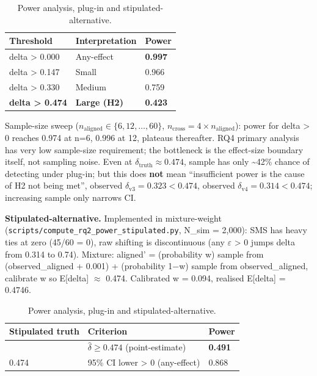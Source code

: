 \documentclass[review,12pt,authoryear]{elsarticle}
\begin{document}
{\def\LTcaptype{table} %
\begin{longtable}[]{@{}lll@{}}
\caption{Power analysis, plug-in and stipulated-alternative.}\label{tab:p2-23}\\
\toprule\noalign{}
Threshold & Interpretation & Power \\
\midrule\noalign{}
\endfirsthead
\endhead
\bottomrule\noalign{}
\endlastfoot
delta \textgreater{} 0.000 & Any-effect & \textbf{0.997} \\
delta \textgreater{} 0.147 & Small & 0.966 \\
delta \textgreater{} 0.330 & Medium & 0.759 \\
\textbf{delta \textgreater{} 0.474} & \textbf{Large (H2)} &
\textbf{0.423} \\
\end{longtable}
}

Sample-size sweep ($n_{\mathrm{aligned}} \in \{6, 12, \ldots, 60\}$, $n_{\mathrm{cross}} = 4 \times n_{\mathrm{aligned}}$):
power for delta \textgreater{} 0 reaches 0.974 at n=6, 0.996 at 12,
plateaus thereafter. RQ4 primary analysis has very low sample-size
requirement; the bottleneck is the effect-size boundary itself, not
sampling noise. Even at $\delta_{\mathrm{truth}} \approx 0.474$, sample has only
\textasciitilde42\% chance of detecting under plug-in; but this does
\textbf{not} mean ``insufficient power is the cause of H2 not being
met'', observed $\delta_{\mathrm{v3}} = 0.323 < 0.474$, observed
$\delta_{\mathrm{v4}} = 0.314 < 0.474$; increasing sample only narrows CI.

\textbf{Stipulated-alternative.} Implemented in
mixture-weight (\texttt{scripts/compute\_rq2\_power\_stipulated.py},
N\_sim = 2,000): SMS has heavy ties at zero (45/60 = 0), raw shifting is
discontinuous (any $\varepsilon$ \textgreater{} 0 jumps delta from 0.314 to 0.74).
Mixture: aligned' = (probability w) sample from (observed\_aligned +
0.001) + (probability 1−w) sample from observed\_aligned, calibrate w so
E{[}delta{]} $\approx$ 0.474. Calibrated w = 0.094, realised E{[}delta{]} =
0.4746.

{\def\LTcaptype{table} %
\begin{longtable}[]{@{}lll@{}}
\caption{Power analysis, plug-in and stipulated-alternative.}\label{tab:p2-24}\\
\toprule\noalign{}
Stipulated truth & Criterion & Power \\
\midrule\noalign{}
\endfirsthead
\endhead
\bottomrule\noalign{}
\endlastfoot
0.474 & $\hat{\delta} \geq 0.474$ (point-estimate) & \textbf{0.491} \\
0.474 & 95\% CI lower \textgreater{} 0 (any-effect) & 0.868 \\
\end{longtable}
}
\end{document}
